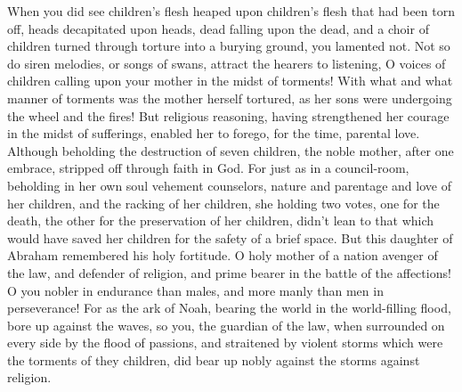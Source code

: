 {When you did see children’s flesh heaped upon children’s flesh that had been torn off, heads decapitated upon heads, dead falling upon the dead, and a choir of children turned through torture into a burying ground, you lamented not.
Not so do siren melodies, or songs of swans, attract the hearers to listening, O voices of children calling upon your mother in the midst of torments!
With what and what manner of torments was the mother herself tortured, as her sons were undergoing the wheel and the fires!
But religious reasoning, having strengthened her courage in the midst of sufferings, enabled her to forego, for the time, parental love.
Although beholding the destruction of seven children, the noble mother, after one embrace, stripped off
{} through faith in God.
For just as in a council-room, beholding in her own soul vehement counselors, nature and parentage and love of her children, and the racking of her children,
she holding two votes, one for the death, the other for the preservation of her children,
didn’t lean to that which would have saved her children for the safety of a brief space.
But this daughter of Abraham remembered his holy fortitude.
O holy mother of a nation avenger of the law, and defender of religion, and prime bearer in the battle of the affections!
O you nobler in endurance than males, and more manly than men in perseverance!
For as the ark of Noah, bearing the world in the world-filling flood, bore up against the waves,
so you, the guardian of the law, when surrounded on every side by the flood of passions, and straitened by violent storms which were the torments of they children, did bear up nobly against the storms against religion.

}
